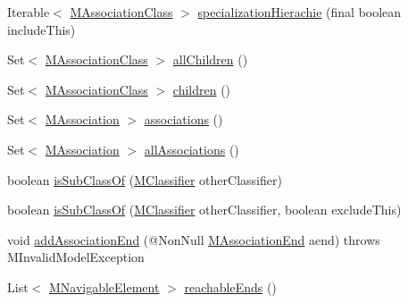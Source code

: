 \begin{DoxyCompactItemize}
\item 
Iterable$<$ \hyperlink{interfaceorg_1_1tzi_1_1use_1_1uml_1_1mm_1_1_m_association_class}{M\-Association\-Class} $>$ \hyperlink{classorg_1_1tzi_1_1use_1_1uml_1_1mm_1_1_m_association_class_impl_aeeaeeb41b4a4dec636ed2fca23de77ae}{specialization\-Hierachie} (final boolean include\-This)
\item 
Set$<$ \hyperlink{interfaceorg_1_1tzi_1_1use_1_1uml_1_1mm_1_1_m_association_class}{M\-Association\-Class} $>$ \hyperlink{classorg_1_1tzi_1_1use_1_1uml_1_1mm_1_1_m_association_class_impl_a755fee3eeb1413348e4abe69f5f75fda}{all\-Children} ()
\item 
Set$<$ \hyperlink{interfaceorg_1_1tzi_1_1use_1_1uml_1_1mm_1_1_m_association_class}{M\-Association\-Class} $>$ \hyperlink{classorg_1_1tzi_1_1use_1_1uml_1_1mm_1_1_m_association_class_impl_af3ff9235f82bb3c53a86c49681e94439}{children} ()
\item 
Set$<$ \hyperlink{interfaceorg_1_1tzi_1_1use_1_1uml_1_1mm_1_1_m_association}{M\-Association} $>$ \hyperlink{classorg_1_1tzi_1_1use_1_1uml_1_1mm_1_1_m_association_class_impl_a2b2af51e22a64372d10a314db1e58579}{associations} ()
\item 
Set$<$ \hyperlink{interfaceorg_1_1tzi_1_1use_1_1uml_1_1mm_1_1_m_association}{M\-Association} $>$ \hyperlink{classorg_1_1tzi_1_1use_1_1uml_1_1mm_1_1_m_association_class_impl_ae6273bbb566b4c36a09f177efe7165cd}{all\-Associations} ()
\item 
boolean \hyperlink{classorg_1_1tzi_1_1use_1_1uml_1_1mm_1_1_m_association_class_impl_a0b626090248183aa1d25ee05e816dc38}{is\-Sub\-Class\-Of} (\hyperlink{interfaceorg_1_1tzi_1_1use_1_1uml_1_1mm_1_1_m_classifier}{M\-Classifier} other\-Classifier)
\item 
boolean \hyperlink{classorg_1_1tzi_1_1use_1_1uml_1_1mm_1_1_m_association_class_impl_a9295be932ac76793a59f5794018c1121}{is\-Sub\-Class\-Of} (\hyperlink{interfaceorg_1_1tzi_1_1use_1_1uml_1_1mm_1_1_m_classifier}{M\-Classifier} other\-Classifier, boolean exclude\-This)
\item 
void \hyperlink{classorg_1_1tzi_1_1use_1_1uml_1_1mm_1_1_m_association_class_impl_a3312fd267257ad11d8b1d4dee420cdcd}{add\-Association\-End} (@Non\-Null \hyperlink{classorg_1_1tzi_1_1use_1_1uml_1_1mm_1_1_m_association_end}{M\-Association\-End} aend)  throws M\-Invalid\-Model\-Exception 
\item 
List$<$ \hyperlink{interfaceorg_1_1tzi_1_1use_1_1uml_1_1mm_1_1_m_navigable_element}{M\-Navigable\-Element} $>$ \hyperlink{classorg_1_1tzi_1_1use_1_1uml_1_1mm_1_1_m_association_class_impl_ac804b2a5b00c9c24a92485cd38ffda63}{reachable\-Ends} ()

\end{DoxyCompactItemize}
